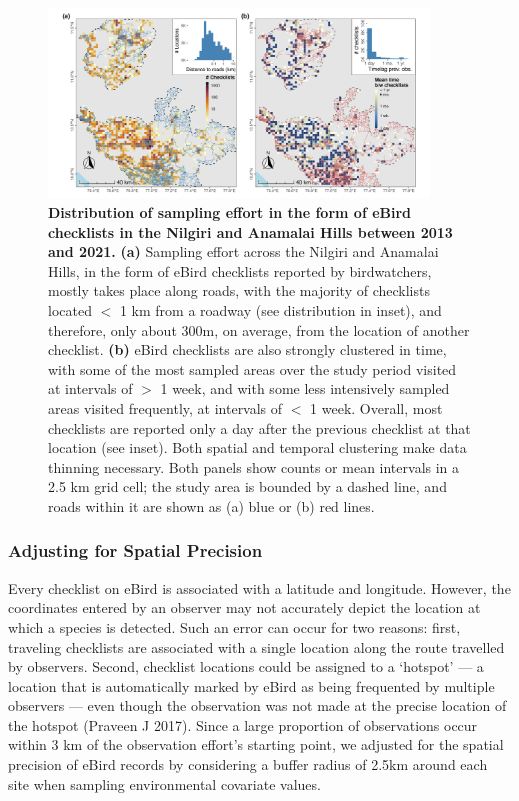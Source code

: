 \begin{figure}[t!]
    \centering
    \includegraphics[width=0.9\textwidth]{figures/hillybirds/fig_03.png}
    \caption{
        \textbf{Distribution of sampling effort in the form of eBird checklists in the Nilgiri and Anamalai Hills between 2013 and 2021.}
        \textbf{(a)} Sampling effort across the Nilgiri and Anamalai Hills, in the form of eBird checklists reported by birdwatchers, mostly takes place along roads, with the majority of checklists located $<$ 1 km from a roadway (see distribution in inset), and therefore, only about 300m, on average, from the location of another checklist.
        \textbf{(b)} eBird checklists are also strongly clustered in time, with some of the most sampled areas over the study period visited at intervals of $>$ 1 week, and with some less intensively sampled areas visited frequently, at intervals of $<$ 1 week.
        Overall, most checklists are reported only a day after the previous checklist at that location (see inset).
        Both spatial and temporal clustering make data thinning necessary.
        Both panels show counts or mean intervals in a 2.5 km grid cell; the study area is bounded by a dashed line, and roads within it are shown as (a) blue or (b) red lines.
    }
\end{figure}

\subsubsection*{Adjusting for Spatial Precision}

Every checklist on eBird is associated with a latitude and longitude.
However, the coordinates entered by an observer may not accurately depict the location at which a species is detected.
Such an error can occur for two reasons: first, traveling checklists are associated with a single location along the route travelled by observers.
Second, checklist locations could be assigned to a `hotspot' --- a location that is automatically marked by eBird as being frequented by multiple observers --- even though the observation was not made at the precise location of the hotspot (Praveen J 2017).
Since a large proportion of observations occur within 3 km of the observation effort's starting point, we adjusted for the spatial precision of eBird records by considering a buffer radius of 2.5km around each site when sampling environmental covariate values.

